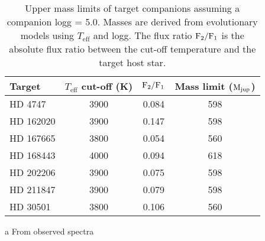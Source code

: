 \begin{table}
    \centering
    \begin{threeparttable}
        \caption{Upper mass limits of target companions assuming a companion logg = 5.0. Masses are derived from \citet{baraffe_new_2015} evolutionary models using \(T_{\textrm{eff}}\) and logg. The flux ratio \(\rm F_2/F_1\) is  the absolute flux ratio between the cut-off temperature and the target host star.}
        \begin{tabular}{l c c c}
            \toprule
            Target & \(T_{\textrm{eff}}\) cut-off (K) & \(\rm F_2/F_1\) & Mass limit ($\rm M_{jup}$)\\
            \midrule
            {HD 4747}     &  3900 & 0.084 & 598 \\
            {HD 162020} & 3900 & 0.147 & 598 \\
            {HD 167665} & 3800 & 0.054 & 560 \\
            {HD 168443} & 4000 & 0.094 & 618 \\
            {HD 202206} & 3900 & 0.075 & 598 \\
            {HD 211847} & 3900 & 0.079 & 598 \\
            {HD 30501}   & 3800\tnote{a} & 0.106 & 560 \\
            \bottomrule
        \end{tabular} \label{tab:mass_limits}
        \begin{tablenotes}[flushleft]
            \item [a] {From observed spectra }
        \end{tablenotes}
    \end{threeparttable}
\end{table}
